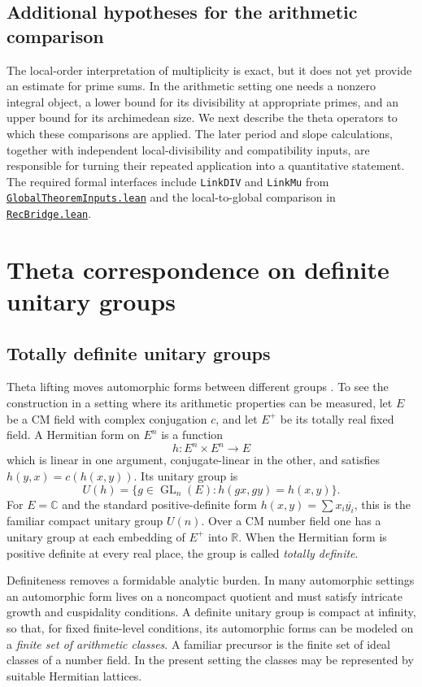 \documentclass[11pt,openany,oneside]{scrbook}
\theoremstyle{definition}
\theoremstyle{remark}
\newcommand{\CC}{\mathbb C}
\newcommand{\RR}{\mathbb R}
\newcommand{\baseurl}{https://github.com/CocoSgt/riemann-hypothesis-lean/blob/7cbf7a0c32fca1badf05931879a37c3f8a2b03b4/}
\newcommand{\sourcefile}[2]{\href{\baseurl#1}{\texttt{#2}}}
\begin{document}
\section{Additional hypotheses for the arithmetic comparison}
The local-order interpretation of multiplicity is exact, but it does not yet provide an estimate for prime sums. In the arithmetic setting one needs a nonzero integral object, a lower bound for its divisibility at appropriate primes, and an upper bound for its archimedean size. We next describe the theta operators to which these comparisons are applied. The later period and slope calculations, together with independent local-divisibility and compatibility inputs, are responsible for turning their repeated application into a quantitative statement.  The required formal interfaces include \texttt{LinkDIV} and \texttt{LinkMu} from \sourcefile{src/Formalism/SharpRestriction/GlobalTheoremInputs.lean}{GlobalTheoremInputs.lean} and the local-to-global comparison in \sourcefile{src/Formalism/LocalToGlobal/Divisibility/RecBridge.lean}{RecBridge.lean}.

\chapter{Theta correspondence on definite unitary groups}\label{ch:theta}

\section{Totally definite unitary groups}

Theta lifting moves automorphic forms between different groups \parencite{Howe1979}. To see the construction in a setting where its arithmetic properties can be measured, let $E$ be a CM field with complex conjugation $c$, and let $E^+$ be its totally real fixed field. A Hermitian form on $E^n$ is a function
\[
 h: E^n\times E^n\longrightarrow E
\]
which is linear in one argument, conjugate-linear in the other, and satisfies $h(y,x)=c(h(x,y))$. Its unitary group is
\[
U(h)=\{g\in\operatorname{GL}_n(E):h(gx,gy)=h(x,y)\}.
\]
For $E=\CC$ and the standard positive-definite form $h(x,y)=\sum x_i\overline{y_i}$, this is the familiar compact unitary group $U(n)$. Over a CM number field one has a unitary group at each embedding of $E^+$ into $\RR$. When the Hermitian form is positive definite at every real place, the group is called \emph{totally definite}.

Definiteness removes a formidable analytic burden. In many automorphic settings an automorphic form lives on a noncompact quotient and must satisfy intricate growth and cuspidality conditions. A definite unitary group is compact at infinity, so that, for fixed finite-level conditions, its automorphic forms can be modeled on a \emph{finite set of arithmetic classes}. A familiar precursor is the finite set of ideal classes of a number field. In the present setting the classes may be represented by suitable Hermitian lattices.
\end{document}
